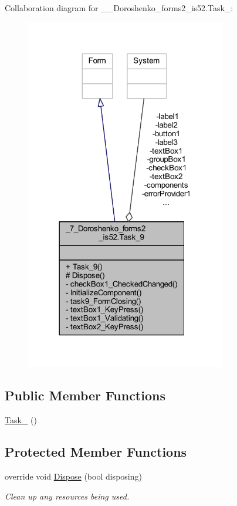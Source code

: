 Collaboration diagram for \+\_\+\_\+\+Doroshenko\+\_\+forms2\+\_\+is52.\+Task\+\_\+:
\nopagebreak
\begin{figure}[H]
\begin{center}
\leavevmode
\includegraphics[width=249pt]{class__7___doroshenko__forms2__is52_1_1_task__9__coll__graph}
\end{center}
\end{figure}
\subsection*{Public Member Functions}
\begin{DoxyCompactItemize}
\item 
\hyperlink{class__7___doroshenko__forms2__is52_1_1_task__9_a678e24f395e1a9fbf761bca24eaf39cf}{Task\+\_} ()
\end{DoxyCompactItemize}
\subsection*{Protected Member Functions}
\begin{DoxyCompactItemize}
\item 
override void \hyperlink{class__7___doroshenko__forms2__is52_1_1_task__9_a2d5755b18b5de4620bf494496877c715}{Dispose} (bool disposing)
\begin{DoxyCompactList}\small\item\em Clean up any resources being used. \end{DoxyCompactList}\end{DoxyCompactItemize}
